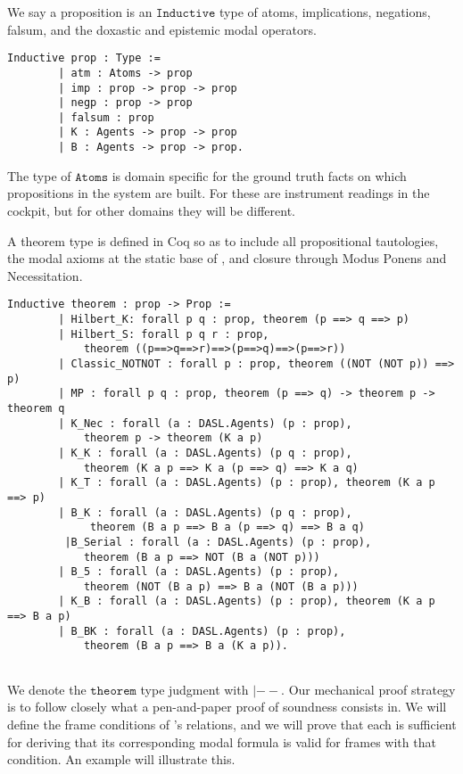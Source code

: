 We say a proposition is an $\mathtt{Inductive}$ type of atoms, implications, negations, falsum, and the doxastic and epistemic modal operators.

\begin{tcolorbox}
	\begin{lstlisting}[language=Coq]
	Inductive prop : Type :=
		| atm : Atoms -> prop
		| imp : prop -> prop -> prop
		| negp : prop -> prop
		| falsum : prop
		| K : Agents -> prop -> prop
		| B : Agents -> prop -> prop.
	\end{lstlisting}	
	
\end{tcolorbox}

The type of $\mathtt{Atoms}$ is domain specific for the ground truth facts on which propositions in the system are built. For \DASL these are instrument readings in the cockpit, but for other domains they will be different.

A theorem type is defined in Coq so as to include all propositional tautologies, the modal axioms at the static base of \DASL, and closure through Modus Ponens and Necessitation.

\begin{tcolorbox}
	\begin{lstlisting}[language=Coq]
	Inductive theorem : prop -> Prop :=
		| Hilbert_K: forall p q : prop, theorem (p ==> q ==> p)
		| Hilbert_S: forall p q r : prop, 
			theorem ((p==>q==>r)==>(p==>q)==>(p==>r))
		| Classic_NOTNOT : forall p : prop, theorem ((NOT (NOT p)) ==> p)
		| MP : forall p q : prop, theorem (p ==> q) -> theorem p -> theorem q
		| K_Nec : forall (a : DASL.Agents) (p : prop), 
			theorem p -> theorem (K a p)
		| K_K : forall (a : DASL.Agents) (p q : prop), 
			theorem (K a p ==> K a (p ==> q) ==> K a q)
		| K_T : forall (a : DASL.Agents) (p : prop), theorem (K a p ==> p)
		| B_K : forall (a : DASL.Agents) (p q : prop),
			 theorem (B a p ==> B a (p ==> q) ==> B a q)
		 |B_Serial : forall (a : DASL.Agents) (p : prop), 
		 	theorem (B a p ==> NOT (B a (NOT p)))
		| B_5 : forall (a : DASL.Agents) (p : prop), 
			theorem (NOT (B a p) ==> B a (NOT (B a p)))
		| K_B : forall (a : DASL.Agents) (p : prop), theorem (K a p ==> B a p)
		| B_BK : forall (a : DASL.Agents) (p : prop), 
			theorem (B a p ==> B a (K a p)).
	
	\end{lstlisting}	
	
\end{tcolorbox}

We denote the $\mathtt{theorem}$ type judgment with $\mathtt{|--}$.  Our mechanical proof strategy is to follow closely what a pen-and-paper proof of soundness consists in. We will define the frame conditions of \DASL's relations, and we will prove that each is sufficient for deriving that its corresponding modal formula is valid for frames with that condition. An example will illustrate this.

